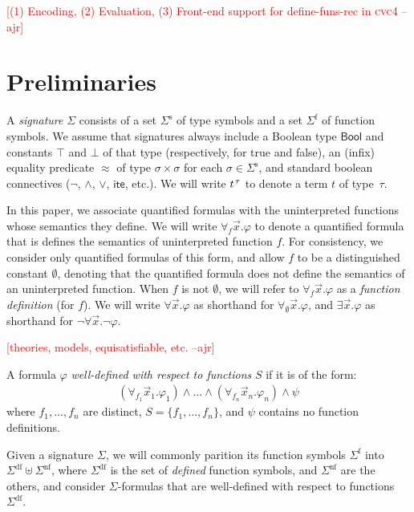 \documentclass[runningheads,a4paper]{llncs}
\newcommand{\con}[1]{\mathsf{#1}}
\newcommand{\cvc}{\textsc{cvc}{\small 4}\xspace}
\newcommand{\teq}{\approx}
\newcommand{\ssorts}[1]{#1^\mathrm{s}}
\newcommand{\sfuns}[1]{#1^\mathrm{f}}
\newcommand{\sfundefs}[1]{#1^\mathrm{df}}
\newcommand{\sfunndefs}[1]{#1^\mathrm{nf}}
\newcommand{\Bool}{\con{Bool}}
\newcommand{\ltrue}{\top}
\newcommand{\lfalse}{\bot}
\newcommand{\lite}{\con{ite}}
\newcommand{\forallf}[1]{\forall_{#1}}
\newcommand{\fnull}{\emptyset}
\newcommand{\rem}[1]{\textcolor{red}{[#1]}}
\newcommand{\ajr}[1]{\rem{#1 --ajr}}
\newcommand{\vthinspace}{\kern+0.083333em}
\newcommand{\typ}[1]{^{\vthinspace #1}}
\begin{document}
\ajr{(1) Encoding, (2) Evaluation, (3) Front-end support for define-funs-rec in \cvc}

\section{Preliminaries}
\label{sec:prelim}

A \emph{signature} $\Sigma$ consists of 
a set $\ssorts{\Sigma}$ of type symbols and
a set $\sfuns{\Sigma}$ of function symbols.
We assume that signatures always include a Boolean type $\Bool$ and constants 
$\ltrue$ and $\lfalse$ of that type (respectively, for true and false), 
an (infix) equality predicate $\teq$ of type $\sigma \times \sigma$ for each $\sigma \in \ssorts{\Sigma}$,
and standard boolean connectives ($\neg$, $\wedge$, $\vee$, $\lite$, etc.).
We will write $t\typ{\tau}$ to denote a term $t$ of type~$\tau$.

In this paper, we associate quantified formulas with the uninterpreted functions whose semantics they define.
We will write $\forallf{f} \vec x. \varphi$ to denote a quantified formula that is defines the semantics of uninterpreted function $f$.
For consistency, we consider only quantified formulas of this form, 
and allow $f$ to be a distinguished constant $\fnull$, 
denoting that the quantified formula does not define the semantics of an uninterpreted function.
When $f$ is not $\fnull$, we will refer to $\forallf{f} \vec x. \varphi$ as a \emph{function definition} (for $f$).
We will write $\forall \vec x. \varphi$ as shorthand for $\forallf{\fnull} \vec x. \varphi$,
and $\exists \vec x. \varphi$ as shorthand for $\neg \forall \vec x. \neg \varphi$.

\ajr{theories, models, equisatisfiable, etc.}


\begin{definition}
A formula $\varphi$ \emph{well-defined with respect to functions} $S$ if it is of the form:
\begin{eqnarray} \label{eq:wdf}
(\forallf{f_1} \vec x_1. \varphi_1) \wedge \ldots \wedge (\forallf{f_n} \vec x_n. \varphi_n) \wedge \psi
\end{eqnarray}
where $f_1, \ldots, f_n$ are distinct, 
$S = \{ f_1, \ldots, f_n \}$,
and $\psi$ contains no function definitions.
\end{definition}

Given a signature $\Sigma$, 
we will commonly parition its function symbols $\sfuns{\Sigma}$ into $\sfundefs{\Sigma} \mathrel{\uplus} \sfunndefs{\Sigma}$,
where $\sfundefs{\Sigma}$ is the set of \emph{defined} function symbols,
and $\sfunndefs{\Sigma}$ are the others,
and consider $\Sigma$-formulas that are well-defined with respect to functions $\sfundefs{\Sigma}$.
\end{document}
